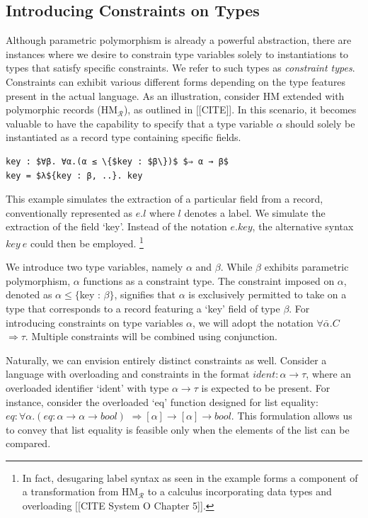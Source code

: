 \documentclass[runningheads]{llncs}
\begin{document}
\subsection{Introducing Constraints on Types}
Although parametric polymorphism is already a powerful abstraction, there are
instances where we desire to constrain type variables solely to instantiations
to types that satisfy specific constraints.
We refer to such types as \emph{constraint types}.
Constraints can exhibit various different forms depending on the type features
present in the actual language.
As an illustration, consider HM extended with polymorphic records
(HM$_{\mathcal{R}}$), as outlined
in [[CITE]].
In this scenario, it becomes valuable to have the capability to specify that a
type variable $α$
should solely be instantiated as a record type containing specific fields.
\begin{example}
  \begin{lstlisting}
key : $∀β. ∀α.(α ≤ \{$key : $β\})$ $⇒ α → β$
key = $λ${key : β, ..}. key
  \end{lstlisting}
\end{example}
This example simulates the extraction of a particular field from a record,
conventionally
represented as $e.l$ where $l$ denotes a label.
We simulate the extraction of  the field `key'.
Instead of the notation $e.key$, the alternative syntax $key \ e$ could then be
employed. \footnote{In fact, desugaring label syntax as seen in the example
  forms a component of
  a transformation from HM$_{\mathcal{R}}$ to a calculus incorporating
  data types and overloading [[CITE System O Chapter 5]].}

We introduce two type variables, namely $α$ and $β$. While $β$ exhibits
parametric polymorphism, $α$ functions as a constraint type.
The constraint imposed on $α$, denoted as $α ≤ \{$key : $β\}$, signifies that
$α$ is exclusively permitted to take on a type that corresponds to a record
featuring a `key' field of type $β$.
For introducing constraints on type variables $α$, we will adopt the notation
$∀\bar{α}.C$ $⇒ τ$. Multiple constraints will be combined using conjunction.

Naturally, we can envision entirely distinct constraints as well.
Consider a language with overloading and constraints in the format
$ident : α → τ$, where an overloaded identifier `ident' with type $α → τ$ is
expected
to be present. For instance, consider the overloaded `eq' function designed for
list equality: $eq : ∀α.(eq : α → α → bool)$ $⇒ [α] → [α] → bool$.
This formulation allows us to convey that list equality is feasible only when
the elements of the list can be compared.
\end{document}
